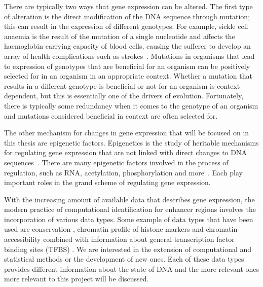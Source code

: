         There are typically two ways that gene expression can be altered.
        The first type of alteration is the direct modification of the DNA sequence through mutation; this can result in the expression of different genotypes.
        For example, sickle cell anaemia is the result of the mutation of a single nucleotide and affects the haemoglobin carrying capacity of blood cells, causing the sufferer to develop an array of health complications such as strokes~\cite{clancy2008dna}. 
        Mutations in organisms that lead to expression of genotypes that are beneficial for an organism can be positively selected for in an organism in an appropriate context. Whether a mutation that results in a different genotype is beneficial or not for an organism is context dependent, but this is essentially one of the drivers of evolution. Fortunately, there is typically some redundancy when it comes to the genotype of an organism and mutations considered beneficial in context are often selected for.
        
        The other mechanism for changes in gene expression that will be focused on in this thesis are epigenetic factors. Epigenetics is the study of heritable mechanisms for regulating gene expression that are not linked with direct changes to DNA sequences~\cite{holliday2006epigenetics}. There are many epigenetic factors involved in the process of regulation, such as RNA, acetylation, phosphorylation and more~\cite{geiman2002chromatin, jaenisch2003epigenetic, holoch2015rna, waterland2003transposable}. Each play important roles in the grand scheme of regulating gene expression. 
        
        With the increasing amount of available data that describes gene expression, the modern practice of computational identification for enhancer regions involves the incorporation of various data types. Some example of data types that have been used are conservation \cite{visel2007enhancer}, chromatin profile of histone markers \cite{won2010genome} and chromatin accessibility combined with information about general transcription factor binding sites (TFBS) \cite{boyle2010high}. We are interested in the extension of computational and statistical methods or the development of new ones. Each of these data types provides different information about the state of DNA and the more relevant ones more relevant to this project will be discussed. 
        
